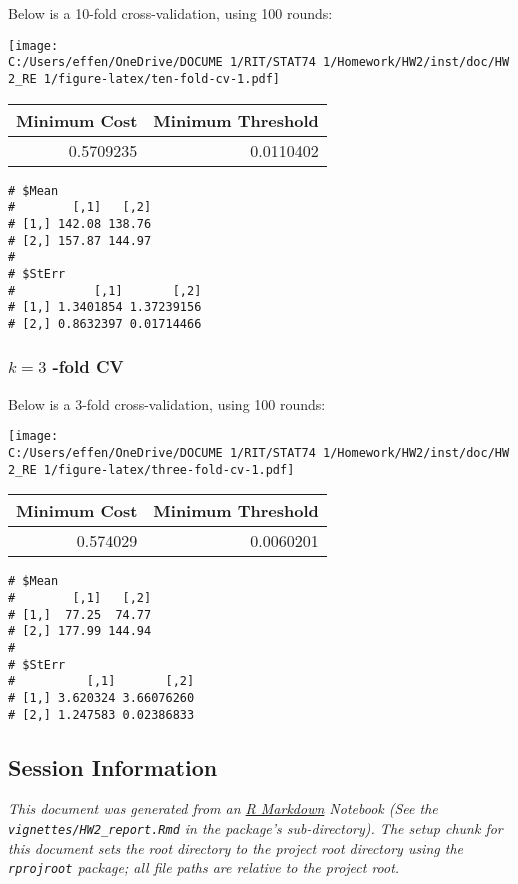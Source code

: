 \documentclass[
  11pt,
  a4paper,
]{scrartcl}
\begin{document}
Below is a 10-fold cross-validation, using 100 rounds:

\texttt{[image: C:/Users/effen/OneDrive/DOCUME~1/RIT/STAT74~1/Homework/HW2/inst/doc/HW2\_RE~1/figure-latex/ten-fold-cv-1.pdf]}

\begin{longtable}[]{@{}rr@{}}
\toprule
Minimum Cost & Minimum Threshold \\
\midrule
\endhead
0.5709235 & 0.0110402 \\
\bottomrule
\end{longtable}

\begin{verbatim}
# $Mean
#        [,1]   [,2]
# [1,] 142.08 138.76
# [2,] 157.87 144.97
# 
# $StErr
#           [,1]       [,2]
# [1,] 1.3401854 1.37239156
# [2,] 0.8632397 0.01714466
\end{verbatim}

\hypertarget{k-3--fold-cv}{%
\subsubsection{\texorpdfstring{\(k = 3\) -fold
CV}{k = 3 -fold CV}}\label{k-3--fold-cv}}

Below is a 3-fold cross-validation, using 100 rounds:

\texttt{[image: C:/Users/effen/OneDrive/DOCUME~1/RIT/STAT74~1/Homework/HW2/inst/doc/HW2\_RE~1/figure-latex/three-fold-cv-1.pdf]}

\begin{longtable}[]{@{}rr@{}}
\toprule
Minimum Cost & Minimum Threshold \\
\midrule
\endhead
0.574029 & 0.0060201 \\
\bottomrule
\end{longtable}

\begin{verbatim}
# $Mean
#        [,1]   [,2]
# [1,]  77.25  74.77
# [2,] 177.99 144.94
# 
# $StErr
#          [,1]       [,2]
# [1,] 3.620324 3.66076260
# [2,] 1.247583 0.02386833
\end{verbatim}

\newpage

\hypertarget{session-information}{%
\subsection{Session Information}\label{session-information}}

\emph{This document was generated from an
\href{http://rmarkdown.rstudio.com}{R Markdown} Notebook (See the
\texttt{vignettes/HW2\_report.Rmd} in the package's sub-directory). The
setup chunk for this document sets the root directory to the project
root directory using the \texttt{rprojroot} package; all file paths are
relative to the project root.}
\end{document}
